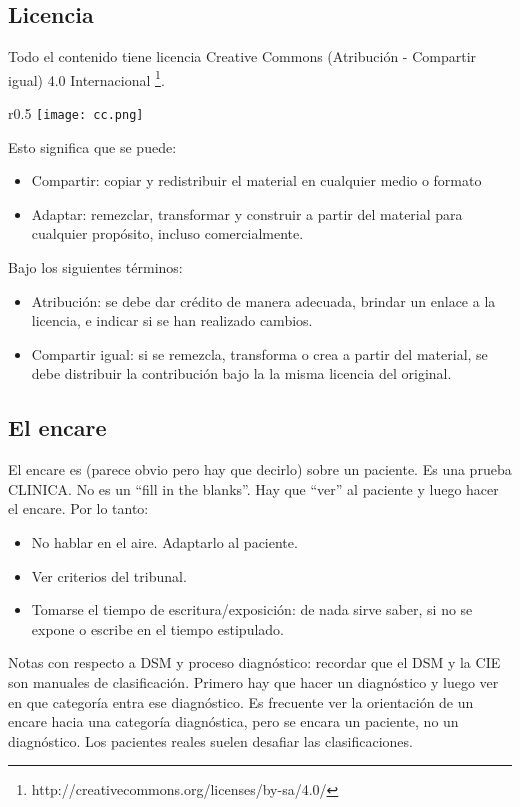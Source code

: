 \subsection*{Licencia}
Todo el contenido tiene licencia Creative Commons (Atribución - Compartir igual) 4.0 Internacional \footnote{http://creativecommons.org/licenses/by-sa/4.0/}.

\begin{wrapfigure}{r}{0.5\textwidth}
	\centering
    \texttt{[image: cc.png]}
\end{wrapfigure}
Esto significa que se puede:
\begin{itemize}
\item Compartir: copiar y redistribuir el material en cualquier medio o formato
\item Adaptar: remezclar, transformar y construir a partir del material para cualquier propósito, incluso comercialmente.
\end{itemize}
Bajo los siguientes términos:
\begin{itemize}
	\item Atribución: se debe dar crédito de manera adecuada, brindar un enlace a la licencia, e indicar si se han realizado cambios.
	\item Compartir igual: si se remezcla, transforma o crea a partir del material, se debe distribuir la contribución bajo la la misma licencia del original.
\end{itemize}
\subsection*{El encare}
El encare es (parece obvio pero hay que decirlo) sobre un paciente. Es una prueba CLINICA. No es un ``fill in the blanks''. Hay que ``ver'' al paciente y luego hacer el encare. Por lo tanto:
\begin{itemize}
	\item No hablar en el aire. Adaptarlo al paciente.
	\item Ver criterios del tribunal.
	\item Tomarse el tiempo de escritura/exposición: de nada sirve saber, si no se expone o escribe en el tiempo estipulado.
\end{itemize}
Notas con respecto a DSM y proceso diagnóstico: recordar que el DSM y la CIE son manuales de clasificación. Primero hay que hacer un diagnóstico y luego ver en que categoría entra ese diagnóstico. Es frecuente ver la orientación de un encare hacia una categoría diagnóstica, pero se encara un paciente, no un diagnóstico. Los pacientes reales suelen desafiar las clasificaciones.

